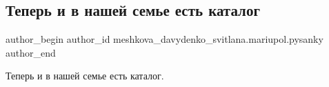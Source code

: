  
 
 
 
 

\subsection{Теперь и в нашей семье есть каталог}
\label{sec:19_03_2017.fb.meshkova_davydenko_svitlana.mariupol.pysanky.1.katalog}

\ifcmt
 author_begin
   author_id meshkova_davydenko_svitlana.mariupol.pysanky
 author_end
\fi

Теперь и в нашей семье есть каталог.
